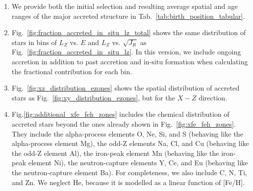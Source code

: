 \documentclass[fleqn,usenatbib]{mnras}
\begin{document}
\begin{enumerate}[leftmargin=2em,labelwidth=0em]
    \item We provide both the initial selection and resulting average spatial and age ranges of the major accreted structure in Tab.~\ref{tab:birth_position_tabular}.
    \item Fig.~\ref{fig:fraction_accreted_in_situ_lz_total} shows the same distribution of stars in bins of $L_Z$ vs. $E$ and $L_Z$ vs. $\sqrt{J_R}$ as Fig.~\ref{fig:fraction_accreted_in_situ_lz}. In this version, we include ongoing accretion in addition to past accretion and in-situ formation when calculating the fractional contribution for each bin. 
    \item Fig.~\ref{fig:xz_distribution_ezones} shows the spatial distribution of accreted stars as Fig.~\ref{fig:xy_distribution_ezones}, but for the $X-Z$ direction.
    \item Fig.\ref{fig:additional_xfe_feh_zones} includes the chemical distribution of accreted stars beyond the ones already shown in Fig.~\ref{fig:xfe_feh_zones}. They include the alpha-process elements O, Ne, Si, and S (behaving like the alpha-process element Mg), the odd-Z elements Na, Cl, and Cu (behaving like the odd-Z element Al), the iron-peak element Mn (behaving like the iron-peak element Ni), the neutron-capture elements Y, Ce, and Eu (behaving like the neutron-capture element Ba). For completeness, we also include C, N, Ti, and Zn. We neglect He, because it is modelled as a linear function of [Fe/H].
\end{enumerate}

\bsp
\label{lastpage}
\end{document}
